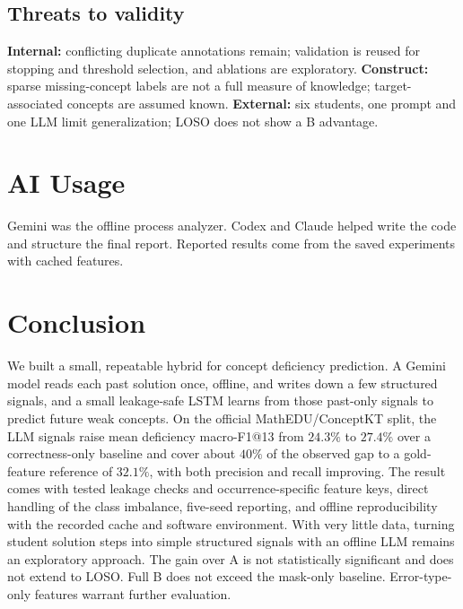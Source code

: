 \documentclass[11pt]{article}
\begin{document}
\subsection{Threats to validity}
\textbf{Internal:} conflicting duplicate annotations remain; validation is reused
for stopping and threshold selection, and ablations are exploratory.
\textbf{Construct:} sparse missing-concept labels are not a full measure of
knowledge; target-associated concepts are assumed known.
\textbf{External:} six students, one prompt and one LLM limit generalization;
LOSO does not show a B advantage.

\section{AI Usage}
Gemini was the offline process analyzer. Codex and Claude helped write the code and
structure the final report. Reported results come from the saved experiments with cached features.


\section{Conclusion}
We built a small, repeatable hybrid for concept deficiency prediction. A Gemini model
reads each past solution once, offline, and writes down a few structured signals, and a
small leakage-safe LSTM learns from those past-only signals to predict future weak
concepts. On the official MathEDU/ConceptKT split, the LLM signals raise mean deficiency
macro-F1@13 from $24.3\%$ to $27.4\%$ over a correctness-only baseline and cover about
$40\%$ of the observed gap to a gold-feature reference of $32.1\%$, with both precision and recall
improving. The result comes with tested leakage checks and occurrence-specific feature keys, direct handling of the
class imbalance, five-seed reporting, and offline reproducibility with the recorded cache and software environment. With very little
data, turning student solution steps into simple structured signals with an offline LLM
remains an exploratory approach. The gain over A is not statistically significant and does not extend to LOSO. Full B does not exceed the mask-only baseline. Error-type-only features warrant further evaluation.
\end{document}
